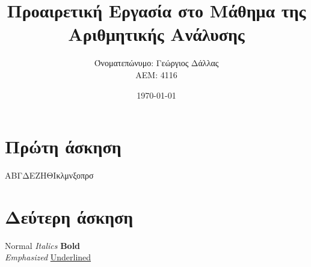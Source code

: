 \documentclass[a4paper,11pt]{article}
\title{\textbf{Προαιρετική Εργασία στο Μάθημα της Αριθμητικής Ανάλυσης}} %
\author{Όνοματεπώνυμο: Γεώργιος Δάλλας  \\  ΑΕΜ: 4116}       %
\date{\today}                                      %
\newcommand{\lt}{\latintext}
\newcommand{\gt}{\greektext}
\begin{document}

\maketitle

\section{Πρώτη άσκηση}
\begin{center}  

{\scriptsize Α}{\footnotesize Β}{\small Γ}{\normalsize Δ}{\large Ε}{\Large Ζ}{\LARGE Η}{\huge Θ}{\Huge Ι}{\huge κ}{\LARGE λ}{\Large μ}{\large ν}{\normalsize ξ}{\small ο}{\footnotesize π}{\scriptsize ρ}{\tiny σ}

\end{center}
\section{Δεύτερη άσκηση}
\begin{center}\lt
Normal \textit{Italics} \textbf{Bold}\\
\emph{Emphasized} \underline{Underlined}
\end{center}\gt
\end{document}
